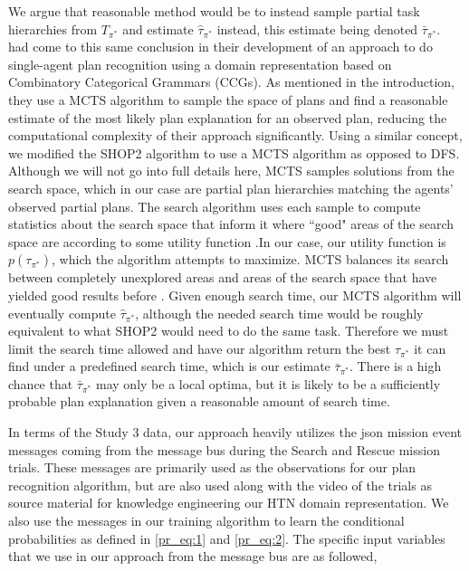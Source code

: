 We argue that reasonable method would be to instead sample partial task hierarchies from $T_{\pi^*}$ and estimate $\hat{\tau}_{\pi^*}$ instead, this estimate being denoted $\bar{\tau}_{\pi^*}$. \citet{Kantharaju_Ontanon_Geib_2019} had come to this same conclusion in their development of an approach to do single-agent plan recognition using a domain representation based on Combinatory Categorical Grammars (CCGs). As mentioned in the introduction, they use a MCTS algorithm to sample the space of plans and find a reasonable estimate of the most likely plan explanation for an observed plan, reducing the computational complexity of their approach significantly. Using a similar concept, we modified the SHOP2 algorithm to use a MCTS algorithm as opposed to DFS. Although we will not go into full details here, MCTS samples solutions from the search space, which in our case are partial plan hierarchies matching the agents' observed partial plans. The search algorithm uses each sample to compute statistics about the search space that inform it where ``good" areas of the search space are according to some utility function \citep{Browne_Powley_Whitehouse_Lucas_Cowling_Rohlfshagen_Tavener_Perez_Samothrakis_Colton_2012,Kantharaju_Ontanon_Geib_2019}.In our case, our utility function is $p(\tau_{\pi^*})$, which the algorithm attempts to maximize. MCTS balances its search between completely unexplored areas and areas of the search space that have yielded good results before \citep{Browne_Powley_Whitehouse_Lucas_Cowling_Rohlfshagen_Tavener_Perez_Samothrakis_Colton_2012,Kantharaju_Ontanon_Geib_2019}. Given enough search time, our MCTS algorithm will eventually compute $\hat{\tau}_{\pi^*}$, although the needed search time would be roughly equivalent to what SHOP2 would need to do the same task. Therefore we must limit the search time allowed and have our algorithm return the best $\tau_{\pi^*}$ it can find under a predefined search time, which is our estimate $\bar{\tau}_{\pi^*}$. There is a high chance that $\bar{\tau}_{\pi^*}$ may only be a local optima, but it is likely to be a sufficiently probable plan explanation given a reasonable amount of search time. 

In terms of the Study 3 data, our approach heavily utilizes the json mission event messages coming from the message bus during the Search and Rescue mission trials. These messages are primarily used as the observations for our plan recognition algorithm, but are also used along with the video of the trials as source material for knowledge engineering our HTN domain representation. We also use the messages in our training algorithm to learn the conditional probabilities as defined in \ref{pr_eq:1} and \ref{pr_eq:2}. The specific input variables that we use in our approach from the message bus are as followed, 

